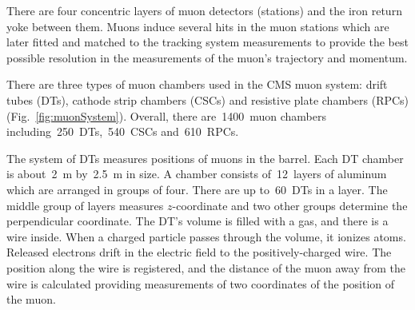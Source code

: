 There are four concentric layers of muon detectors (stations) and the iron return yoke between them. Muons induce several hits in the muon stations which are later fitted and matched to the tracking system measurements to provide the best possible resolution in the measurements of the muon's trajectory and momentum.

There are three types of muon chambers used in the CMS muon system: drift tubes (DTs), cathode strip chambers (CSCs) and resistive plate chambers (RPCs) (Fig.~\ref{fig:muonSystem}). Overall, there are~1400~muon chambers including~250~DTs,~540~CSCs and~610~RPCs.

The system of DTs measures positions of muons in the barrel. Each DT chamber is about~2~m by~2.5~m in size. A chamber consists of~12~layers of aluminum which are arranged in groups of four. There are up to~60~DTs in a layer. The middle group of layers measures $z$-coordinate and two other groups determine the perpendicular coordinate. The DT's volume is filled with a gas, and there is a wire inside. When a charged particle passes through the volume, it ionizes atoms. Released electrons drift in the electric field to the positively-charged wire. The position along the wire is registered, and the distance of the muon away from the wire is calculated providing measurements of two coordinates of the position of the muon.


